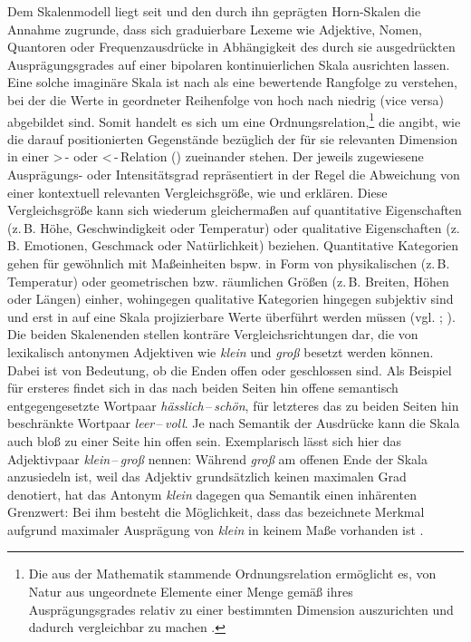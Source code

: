 Dem Skalenmodell liegt seit \citet[]{Horn.1972} und den durch ihn geprägten Horn-Skalen die Annahme zugrunde, dass sich graduierbare Lexeme wie Adjektive, Nomen, Quantoren oder Frequenzausdrücke in Abhängigkeit des durch sie ausgedrückten Ausprägungsgrades auf einer bipolaren kontinuierlichen Skala ausrichten lassen. Eine solche imaginäre Skala ist nach {\citet[128]{Jacobs.1983}} als eine \glqq{}bewertende Rangfolge\grqq{} zu verstehen, bei der die Werte in geordneter Reihenfolge von hoch nach niedrig (vice versa) abgebildet sind. Somit handelt es sich um eine Ordnungsrelation,\footnote{Die aus der Mathematik stammende Ordnungsrelation ermöglicht es, von Natur aus ungeordnete Elemente einer Menge gemäß ihres Ausprägungsgrades relativ zu einer bestimmten Dimension auszurichten und dadurch vergleichbar zu machen \citep[vgl.][26f.]{Lohnstein.2011}.} die angibt, wie die darauf positionierten Gegenstände bezüglich der für sie relevanten Dimension in einer \glqq{}>\,- oder <\,-\,Relation\grqq{} {(\citealt[59]{Os.1989})} zueinander stehen. Der jeweils zugewiesene Ausprägungs- oder Intensitätsgrad repräsentiert in der Regel die Abweichung von einer kontextuell relevanten Vergleichsgröße, wie \citet[59f.]{Stechow.1984} und \citet[132f.]{Gutzmann.2019a} erklären. Diese Vergleichsgröße kann sich wiederum gleichermaßen auf quantitative Eigenschaften (z.\,B. Höhe, Geschwindigkeit oder Temperatur) oder qualitative Eigenschaften (z.\,B. Emotionen, Geschmack oder Natürlichkeit) beziehen. Quantitative Kategorien gehen für gewöhnlich mit Maßeinheiten bspw. in Form von physikalischen (z.\,B. Temperatur) oder geometrischen bzw. räumlichen Größen (z.\,B. Breiten, Höhen oder Längen) einher, wohingegen qualitative Kategorien hingegen subjektiv sind und erst in auf eine Skala projizierbare Werte überführt werden müssen (vgl. {\citealt[103]{Bierwisch.1987b}}; {\citealt[616]{Blutner.1987}}). Die beiden Skalenenden stellen konträre Vergleichsrichtungen dar, die von lexikalisch antonymen Adjektiven wie \textit{klein} und \textit{groß} besetzt werden können. Dabei ist von Bedeutung, ob die Enden offen oder geschlossen sind. Als Beispiel für ersteres findet sich in \citet[57f.]{Os.1989} das nach beiden Seiten hin offene semantisch entgegengesetzte Wortpaar \textit{hässlich}\,--\,\textit{schön}, für letzteres das zu beiden Seiten hin beschränkte Wortpaar \textit{leer}\,--\,\textit{voll}. Je nach Semantik der Ausdrücke kann die Skala auch bloß zu einer Seite hin offen sein. Exemplarisch lässt sich hier das Adjektivpaar \textit{klein}\,--\,\textit{groß} nennen: Während \textit{groß} am offenen Ende der Skala anzusiedeln ist, weil das Adjektiv grundsätzlich keinen maximalen Grad denotiert, hat das Antonym \textit{klein} dagegen qua Semantik einen inhärenten Grenzwert: Bei ihm besteht die Möglichkeit, dass das bezeichnete Merkmal aufgrund maximaler Ausprägung von \textit{klein} in keinem Maße vorhanden ist {\citep[vgl.][57f.]{Os.1989}}.

